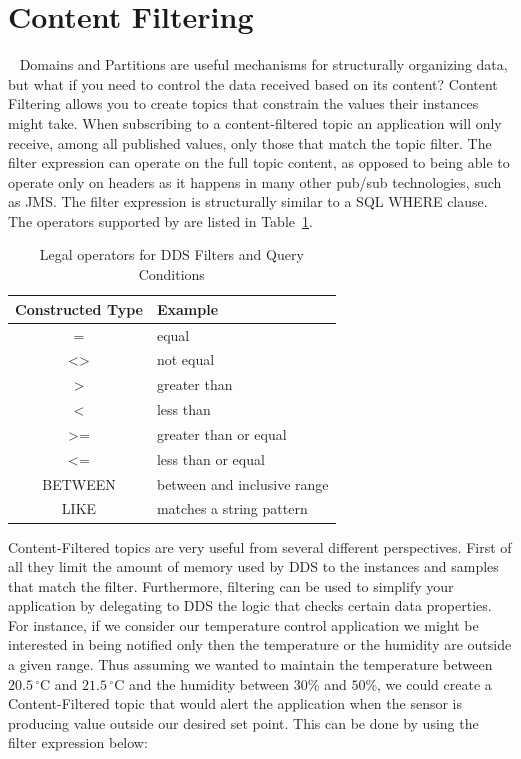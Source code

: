 \section{Content Filtering}~\label{Section:Content:Filtering}
Domains and Partitions are useful mechanisms for structurally organizing data, 
but what if you need to control the data received based on its content? 
Content Filtering allows you to create topics that constrain the 
values their instances might take. When subscribing to a content-filtered 
topic an application will only receive, among all published values, 
only those that match the topic filter.  The filter expression can 
operate on the full topic content, as opposed to being able to operate 
only on headers as it happens in many other pub/sub technologies, 
such as JMS. The filter expression is structurally similar to a SQL WHERE clause.
The operators supported by are listed in Table~\ref{Table:DDS:Filter:Expression}.

\begin{table}
\begin{center}
{\footnotesize\ttfamily
\begin{tabular}{|c|l|} \hline
\textbf{Constructed Type} 	&  	\textbf{Example}  			\\ \hline
              =           	&  	equal  						\\ \hline
              <>          	&  	not equal					\\ \hline
              >           	&  	greater than  				\\ \hline
              <				& 	less than					\\ \hline
              >=				& 	greater than or equal 		\\ \hline
              <=				&	less than or equal			\\ \hline
              BETWEEN		&   between and inclusive range	\\ \hline
              LIKE			&	matches a string pattern		\\ \hline               
\end{tabular}}
\end{center}
\label{Table:DDS:Filter:Expression}
\caption{Legal operators for  DDS Filters and Query Conditions}
\end{table}
Content-Filtered topics are very useful from several different perspectives. 
First of all they limit the amount of memory used by \ac{DDS} to the 
instances and samples that match the filter.  Furthermore, filtering can be 
used to simplify your application by delegating to DDS the logic that checks 
certain data properties. For instance, if we consider our temperature control 
application we might be interested in being notified only then the temperature 
or the humidity are outside a given range. 
Thus assuming we wanted to maintain the temperature between $20.5\,^{\circ}\mathrm{C}$ and 
$21.5\,^{\circ}\mathrm{C}$ and the humidity between $30\%$ and $50\%$, 
we could create a Content-Filtered topic that would alert the application when the 
sensor is producing value outside our desired set point.  This can be done by using the 
filter expression below:


